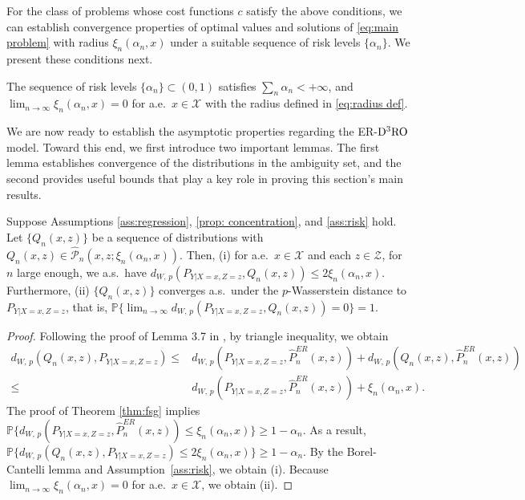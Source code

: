 \documentclass[onefignum,onetabnum]{siamart251216}
\begin{document}
For the class of problems whose cost functions $c$ satisfy the above conditions, we can establish convergence properties of optimal values and solutions of \eqref{eq:main problem} with radius $\xi_n(\alpha_n,x)$ under a suitable sequence of risk levels $\{\alpha_n\}$. We present these conditions next.


\begin{assumption}\label{ass:risk}
    The sequence of risk levels $\{\alpha_n\} \subset (0,1)$ satisfies $\sum_{n}\alpha_n<+\infty$, and $\lim_{n \rightarrow \infty}\xi_n(\alpha_n,x)=0$ for a.e.\ $x \in \mathcal{X}$ with the radius defined in \eqref{eq:radius def}. 
\end{assumption}


We are now ready to establish the asymptotic properties regarding the ER-$\rm{D^3RO}$ model. Toward this end, we first introduce two important lemmas.
The first lemma establishes convergence of the distributions in the ambiguity set, and the second provides useful bounds that play a key role in proving this section's main results. 

\begin{lemma}\label{lemma: Q conv}
Suppose Assumptions \ref{ass:regression}, \ref{prop: concentration}, and \ref{ass:risk} hold. Let $\{Q_n(x,z)\}$ be a sequence of distributions with $Q_n(x,z) \in \hat{\mathcal{P}}_n(x,z; \xi_n(\alpha_n,x))$. Then, 
     (i) 
for a.e.\ $x \in \mathcal{X}$ and each $z\in\mathcal{Z}$, 
    for $n$ large enough, we a.s.\ have
    $d_{W,\, p}(P_{Y|X=x,Z=z},Q_n(x,z))
    \leq 2\xi_n(\alpha_n,x)$. 
     Furthermore, 
     (ii)
     $\{Q_n(x,z)\}$ converges a.s.\ under the $p$-Wasserstein distance
     to $P_{Y|X=x,Z=z}$, that is, $
    \mathbb{P}\Big\{\lim_{n \rightarrow \infty} d_{W,\, p} (P_{Y|X=x, Z=z}, Q_n(x,z))=0\Big\}=1.
    $
\end{lemma}
\begin{proof}
    Following the proof of Lemma 3.7 in \cite{esfahani2015data}, by triangle inequality, we obtain
    \small
    \begin{align*}
        d_{W,\, p}(Q_n(x,z), P_{Y|X=x,Z=z}) %
        \leq & d_{W,\, p} (P_{Y|X=x,Z=z}, \hat{P}_n^{ER}(x,z)) + d_{W,\, p} (Q_n(x,z), \hat{P}_n^{ER}(x,z))\\
     \leq & d_{W,\, p} (P_{Y|X=x,Z=z}, \hat{P}_n^{ER}(x,z)) + \xi_n(\alpha_n,x).
    \end{align*}
    \normalsize
    The proof of Theorem \ref{thm:fsg} implies $ \mathbb{P}\bigl\{d_{W,\, p}(P_{Y|X=x,Z=z}, \hat{P}_n^{ER}(x,z)) \leq \xi_n(\alpha_n,x)\bigr\}\geq 1 - \alpha_n$. As a result, $\mathbb{P}\bigl\{d_{W,\, p}(Q_n(x,z), P_{Y|X=x,Z=z}) \leq 2\xi_n(\alpha_n,x)\bigr\} \geq 1-\alpha_n$. By the  Borel-Cantelli lemma \citep[][Theorem 2.18]{kallenberg1997foundations} and Assumption~\ref{ass:risk}, we obtain (i). Because $\lim_{n \rightarrow \infty}\xi_n(\alpha_n,x)=0$ for a.e.\ $x \in \mathcal{X}$, we obtain (ii). 
\end{proof}
\end{document}
